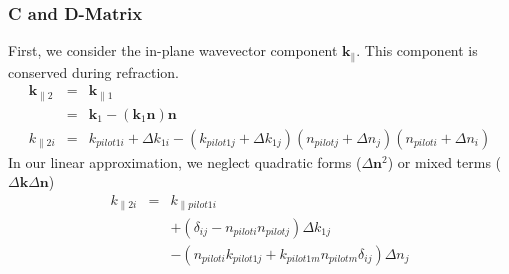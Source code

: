 \documentclass[12pt,a4paper,twoside,openright,BCOR10mm,headsepline,titlepage,abstracton,chapterprefix,final]{scrreprt}
\newcommand\Vector[1]{{\mathbf{#1}}}
\newcommand\wavenumber{k}
\newcommand\Wavevector{\Vector{\wavenumber}}
\begin{document}
\subsubsection{C and D-Matrix}
First, we consider the in-plane wavevector component $\Wavevector_\parallel$.
This component is conserved during refraction.
\begin{eqnarray}
 \Wavevector_{\parallel2} 
 &=& \Wavevector_{\parallel1} \\
 &=& \Wavevector_1 - (\Wavevector_1 \Vector{n}) \Vector{n} \\
 \wavenumber_{\parallel2i}
 &=& \wavenumber_{pilot1i} + \Delta \wavenumber_{1i} - ( \wavenumber_{pilot1j} + \Delta \wavenumber_{1j} )( n_{pilotj} + \Delta n_j )( n_{piloti} + \Delta n_i )
\end{eqnarray}
In our linear approximation, we neglect quadratic forms ($\Delta \Vector{n}^2$) or mixed terms ($\Delta \Wavevector \Delta \Vector{n}$)
\begin{eqnarray}
 \wavenumber_{\parallel2i}
 &=& 
 \wavenumber_{\parallel pilot1i} \nonumber\\
 &&+ ( \delta_{ij} -  n_{piloti} n_{pilotj} ) \Delta \wavenumber_{1j} \nonumber\\
 &&- ( n_{piloti} \wavenumber_{pilot1j} + \wavenumber_{pilot1m}   n_{pilotm} \delta_{ij}) \Delta n_j
\end{eqnarray}
\end{document}

